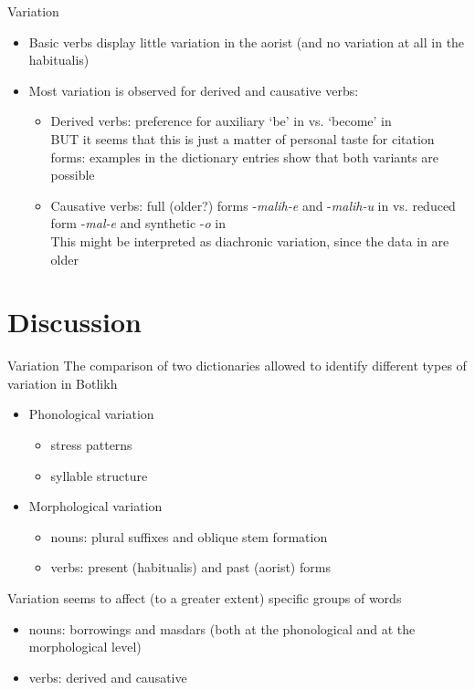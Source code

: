 \begin{frame}{Variation}
\begin{itemize}
    \item Basic verbs display little variation in the aorist (and no variation at all in the habitualis)
    \item Most variation is observed for derived and causative verbs:
    \begin{itemize}
        \item Derived verbs: preference for auxiliary `be' in \citet{saidovaabusov2012} vs. `become' in \citet{alekseev2019} \\ BUT it seems that this is just a matter of personal taste for citation forms: examples in the dictionary entries show that both variants are possible
        \item Causative verbs: full (older?) forms -\textit{malih-e} and -\textit{malih-u} in \citet{alekseev2019} vs. reduced form -\textit{mal-e} and synthetic -\textit{o} in \citet{saidovaabusov2012} \\ This might be interpreted as diachronic variation, since the data in \citet{alekseev2019} are older
    \end{itemize}
\end{itemize}
\end{frame}

\section{Discussion}
\begin{frame}{Variation}
The comparison of two dictionaries allowed to identify different types of variation in Botlikh
\begin{itemize}
    \item Phonological variation
    \begin{itemize}
        \item stress patterns
        \item syllable structure
    \end{itemize}
    \item Morphological variation
    \begin{itemize}
        \item nouns: plural suffixes and oblique stem formation
        \item verbs: present (habitualis) and past (aorist) forms
    \end{itemize}
\end{itemize}
Variation seems to affect (to a greater extent) specific groups of words
\begin{itemize}
    \item nouns: borrowings and masdars (both at the phonological and at the morphological level)
    \item verbs: derived and causative
\end{itemize}
\end{frame}


